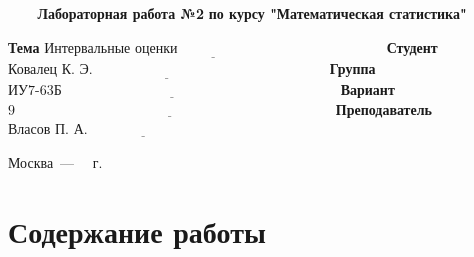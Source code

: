 \documentclass[a4paper,14pt, unknownkeysallowed]{extreport}
\begin{document}
\begin{titlepage}
	
	\begin{center}
		\noindent\begin{minipage}{1.3\textwidth}\centering
		\Large\textbf{   ~~~ Лабораторная работа №2}\newline
		\textbf{по курсу "Математическая статистика"}\newline\newline\newline\newline
		\end{minipage}
	\end{center}
	
	\noindent\textbf{Тема} 			$\underline{\text{Интервальные оценки~~~~~~~~~~~~~~~~~~~~~~~~~~~~~~~~~~~~~~~~~~~~}}$\newline\newline
	\noindent\textbf{Студент} 		$\underline{\text{Ковалец К. Э.~~~~~~~~~~~~~~~~~~~~~~~~~~~~~~~~~~~~~~~~~~~~~~~~~~}}$\newline\newline
	\noindent\textbf{Группа} 		$\underline{\text{ИУ7-63Б~~~~~~~~~~~~~~~~~~~~~~~~~~~~~~~~~~~~~~~~~~~~~~~~~~~~~~~~~~~}}$\newline\newline
	\noindent\textbf{Вариант} 		$\underline{\text{9~~~~~~~~~~~~~~~~~~~~~~~~~~~~~~~~~~~~~~~~~~~~~~~~~~~~~~~~~~~~~~~~~~~~}}$\newline\newline
	\noindent\textbf{Преподаватель} $\underline{\text{Власов П. А.~~~~~~~~~~~~~~~~~~~~~~~~~~~~~~~~~~~~~~~~~}}$\newline
	
	\begin{center}
		\vfill
		Москва~---~\the\year
		~г.
	\end{center}
	\restoregeometry
\end{titlepage}



\setcounter{page}{2}

\chapter{Содержание работы}
\end{document}
